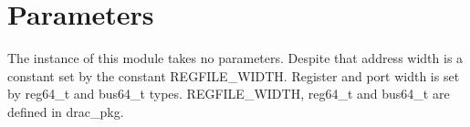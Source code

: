 \section{Parameters}
\label{chapter3}

The instance of this module takes no parameters. Despite that address width is a constant set by the constant REGFILE\_WIDTH. Register and port width is set by reg64\_t and bus64\_t types.
REGFILE\_WIDTH, reg64\_t and bus64\_t are defined in drac\_pkg.
